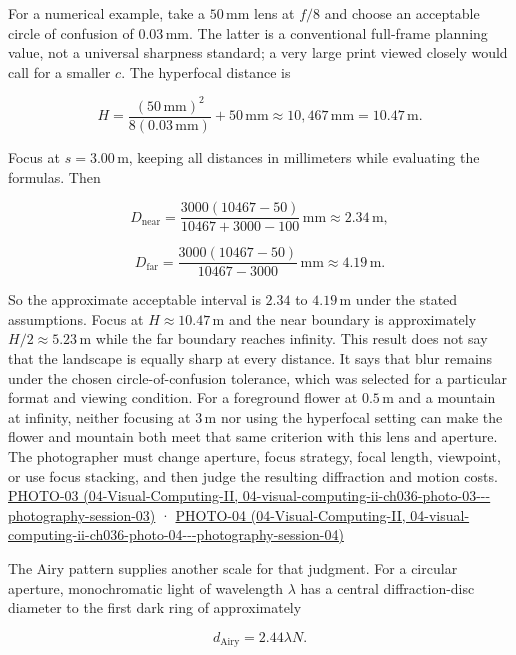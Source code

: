 For a numerical example, take a \(50\,\mathrm{mm}\) lens at \(f/8\) and choose an acceptable circle of confusion of \(0.03\,\mathrm{mm}\). The latter is a conventional full-frame planning value, not a universal sharpness standard; a very large print viewed closely would call for a smaller \(c\). The hyperfocal distance is

\[
H=\frac{(50\,\mathrm{mm})^2}{8(0.03\,\mathrm{mm})}+50\,\mathrm{mm}\approx10{,}467\,\mathrm{mm}=10.47\,\mathrm{m}.
\]

Focus at \(s=3.00\,\mathrm{m}\), keeping all distances in millimeters while evaluating the formulas. Then

\[
D_{\mathrm{near}}=\frac{3000(10467-50)}{10467+3000-100}\,\mathrm{mm}\approx2.34\,\mathrm{m},
\]

\[
D_{\mathrm{far}}=\frac{3000(10467-50)}{10467-3000}\,\mathrm{mm}\approx4.19\,\mathrm{m}.
\]

So the approximate acceptable interval is \(2.34\) to \(4.19\,\mathrm{m}\) under the stated assumptions. Focus at \(H\approx10.47\,\mathrm{m}\) and the near boundary is approximately \(H/2\approx5.23\,\mathrm{m}\) while the far boundary reaches infinity. This result does not say that the landscape is equally sharp at every distance. It says that blur remains under the chosen circle-of-confusion tolerance, which was selected for a particular format and viewing condition. For a foreground flower at \(0.5\,\mathrm{m}\) and a mountain at infinity, neither focusing at \(3\,\mathrm{m}\) nor using the hyperfocal setting can make the flower and mountain both meet that same criterion with this lens and aperture. The photographer must change aperture, focus strategy, focal length, viewpoint, or use focus stacking, and then judge the resulting diffraction and motion costs. \href{../04-Visual-Computing-II/main.pdf\#nameddest=04-visual-computing-ii-ch036-photo-03---photography-session-03}{PHOTO-03 (04-Visual-Computing-II, 04-visual-computing-ii-ch036-photo-03-\/-\/-photography-session-03)} · \href{../04-Visual-Computing-II/main.pdf\#nameddest=04-visual-computing-ii-ch036-photo-04---photography-session-04}{PHOTO-04 (04-Visual-Computing-II, 04-visual-computing-ii-ch036-photo-04-\/-\/-photography-session-04)}

The Airy pattern supplies another scale for that judgment. For a circular aperture, monochromatic light of wavelength \(\lambda\) has a central diffraction-disc diameter to the first dark ring of approximately

\[
d_{\mathrm{Airy}}=2.44\lambda N.
\]

